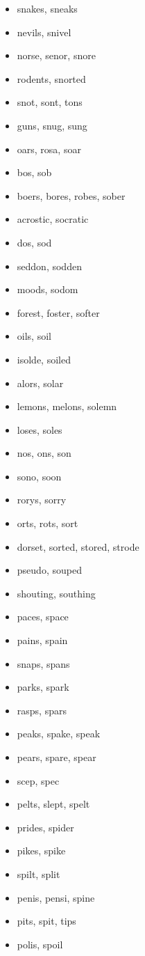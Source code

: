 \documentclass[a4wide,11pt]{report}
\begin{document}
\begin{itemize}
  \item snakes, sneaks
  \item nevils, snivel
  \item norse, senor, snore
  \item rodents, snorted
  \item snot, sont, tons
  \item guns, snug, sung
  \item oars, rosa, soar
  \item bos, sob
  \item boers, bores, robes, sober
  \item acrostic, socratic
  \item dos, sod
  \item seddon, sodden
  \item moods, sodom
  \item forest, foster, softer
  \item oils, soil
  \item isolde, soiled
  \item alors, solar
  \item lemons, melons, solemn
  \item loses, soles
  \item nos, ons, son
  \item sono, soon
  \item rorys, sorry
  \item orts, rots, sort
  \item dorset, sorted, stored, strode
  \item pseudo, souped
  \item shouting, southing
  \item paces, space
  \item pains, spain
  \item snaps, spans
  \item parks, spark
  \item rasps, spars
  \item peaks, spake, speak
  \item pears, spare, spear
  \item scep, spec
  \item pelts, slept, spelt
  \item prides, spider
  \item pikes, spike
  \item spilt, split
  \item penis, pensi, spine
  \item pits, spit, tips
  \item polis, spoil

\end{itemize}
\end{document}

